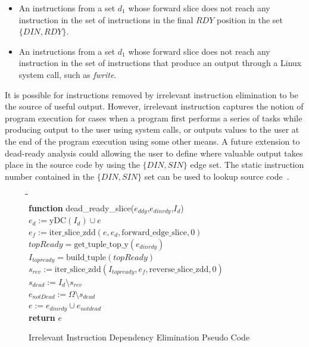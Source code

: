 \documentclass[defaultstyle,11pt]{thesis}
\begin{document}
\begin{itemize}
\item An instructions from a set $d_1$ whose forward slice does not
  reach any instruction in the set of instructions in the final $RDY$
  position in the set $\{DIN,RDY\}$.

\item An instructions from a set $d_1$ whose forward slice does not
  reach any instruction in the set of instructions that produce an
  output through a Linux system call, such as \textit{fwrite}.
\end{itemize}

It is possible for instructions removed by irrelevant instruction
elimination to be the source of useful output.  However, irrelevant
instruction captures the notion of program execution for cases when a
program first performs a series of tasks while producing output to the
user using system calls, or outputs values to the user at the end of
the program execution using some other means. A future extension to
dead-ready analysis could allowing the user to define where valuable
output takes place in the source code by using the $\{DIN,SIN\}$ edge
set.  The static instruction number contained in the $\{DIN,SIN\}$ set
can be used to lookup source code~\cite{price:08:pact}.

\begin{figure}
\begin{center}
\begin{minipage}{1.5in}
\begin{tabbing}
\hspace{1em}\=\hspace{1em}\=\hspace{1em}\=\hspace{1em}\=\\
\textbf{function} dead\_ready\_slice($e_{ddg}$,$e_{dinrdy}$,$I_d$)\\
\>$e_{d} := \mathrm{yDC}(I_{d}) \cup e$\\
\>$e_f := \mathrm{iter\_slice\_zdd}(e, e_{d},\mathrm{forward\_edge\_slice},0)$\\
\>$topReady = \mathrm{get\_tuple\_top\_y}(e_{dinrdy})$ \\
\>$I_{topready} = \mathrm{build\_tuple}(topReady)$ \\
\>$s_{rev} :=\mathrm{iter\_slice\_zdd}(I_{topready}, e_{f},\mathrm{reverse\_slice\_zdd},0)$\\
\>$s_{dead} := I_d \setminus s_{rev}$\\ 
\>$e_{notDead} := \Omega \setminus s_{dead}$\\
\>$e := e_{dinrdy} \cup e_{notdead}$\\
\>\textbf{return} $e$
\end{tabbing}
\end{minipage}
\end{center}
\caption{Irrelevant Instruction Dependency Elimination Pseudo Code}
\label{fig:deadslice}
\end{figure}
\end{document}
